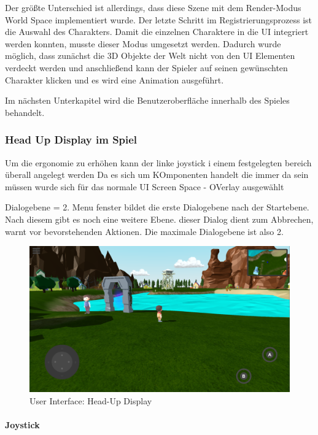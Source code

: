 			Der größte Unterschied ist allerdings, dass diese Szene mit dem Render-Modus World Space implementiert wurde. Der letzte Schritt im Registrierungsprozess ist die Auswahl des Charakters. Damit die einzelnen Charaktere in die UI integriert werden konnten, musste dieser Modus umgesetzt werden. Dadurch wurde möglich, dass zunächst die 3D Objekte der Welt nicht von den UI Elementen verdeckt werden und anschließend kann der Spieler auf seinen gewünschten Charakter klicken und es wird eine Animation ausgeführt. 
			
			Im nächsten Unterkapitel wird die Benutzeroberfläche innerhalb des Spieles behandelt. 
		
		\subsubsection{Head Up Display im Spiel}
			Um die ergonomie zu erhöhen kann der linke joystick i einem festgelegten bereich überall angelegt werden
			Da es sich um KOmponenten handelt die immer da sein müssen wurde sich für das normale UI Screen Space - OVerlay ausgewählt
			
			Dialogebene = 2. Menu fenster bildet die erste Dialogebene nach der Startebene. Nach diesem gibt es noch eine weitere Ebene. dieser Dialog dient zum Abbrechen, warnt vor bevorstehenden Aktionen. Die maximale Dialogebene ist also 2. 
			
			\begin{figure}[htbp]
				\centering 
				\label{alwaysOnUI}
				\includegraphics[width=13cm]{pics/alwaysOnUI.png}
				\caption{User Interface: Head-Up Display}
			\end{figure}
		
			\paragraph{Joystick}
			
